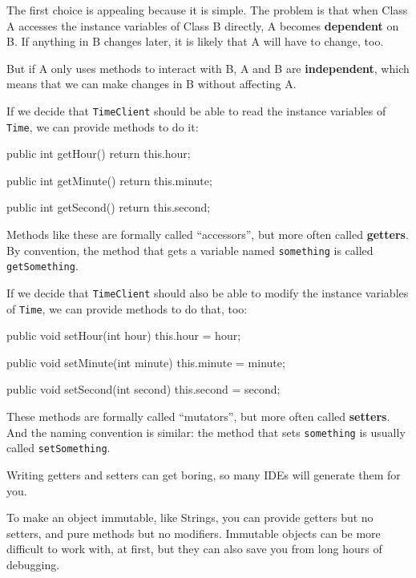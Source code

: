 \documentclass[12pt]{book}
\theoremstyle{exercise}
\newcommand{\java}[1]{\verb"#1"}
\newcommand{\java}[1]{\lstinline{#1}} %
\begin{document}
The first choice is appealing because it is simple.
The problem is that when Class A accesses the instance variables of Class B directly, A becomes {\bf dependent} on B.
If anything in B changes later, it is likely that A will have to change, too.

But if A only uses methods to interact with B, A and B are {\bf independent}, which means that we can make changes in B without affecting A.

If we decide that \java{TimeClient} should be able to read the instance variables of \java{Time}, we can provide methods to do it:

\begin{code}
    public int getHour() {
        return this.hour;
    }

    public int getMinute() {
        return this.minute;
    }

    public int getSecond() {
        return this.second;
    }
\end{code}


Methods like these are formally called ``accessors'', but more often called {\bf getters}.
By convention, the method that gets a variable named \java{something} is called \java{getSomething}.

If we decide that \java{TimeClient} should also be able to modify the instance variables of \java{Time}, we can provide methods to do that, too:

\begin{code}
    public void setHour(int hour) {
        this.hour = hour;
    }

    public void setMinute(int minute) {
        this.minute = minute;
    }

    public void setSecond(int second) {
        this.second = second;
    }
\end{code}

These methods are formally called ``mutators'', but more often called {\bf setters}.
And the naming convention is similar: the method that sets \java{something} is usually called \java{setSomething}.

Writing getters and setters can get boring, so many IDEs will generate them for you.

To make an object immutable, like Strings, you can provide getters but no setters, and pure methods but no modifiers.
Immutable objects can be more difficult to work with, at first, but they can also save you from long hours of debugging.
\end{document}
